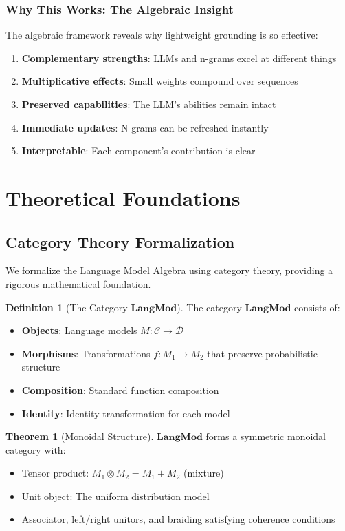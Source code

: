 \documentclass{article}
\theoremstyle{definition}
\newtheorem{definition}{Definition}
\newtheorem{theorem}{Theorem}
\begin{document}
\subsubsection{Why This Works: The Algebraic Insight}

The algebraic framework reveals why lightweight grounding is so effective:
\begin{enumerate}
    \item \textbf{Complementary strengths}: LLMs and n-grams excel at different things
    \item \textbf{Multiplicative effects}: Small weights compound over sequences
    \item \textbf{Preserved capabilities}: The LLM's abilities remain intact
    \item \textbf{Immediate updates}: N-grams can be refreshed instantly
    \item \textbf{Interpretable}: Each component's contribution is clear
\end{enumerate}

\section{Theoretical Foundations}

\subsection{Category Theory Formalization}

We formalize the Language Model Algebra using category theory, providing a rigorous mathematical foundation.

\begin{definition}[The Category $\mathbf{LangMod}$]
The category $\mathbf{LangMod}$ consists of:
\begin{itemize}
    \item \textbf{Objects}: Language models $M: \mathcal{C} \rightarrow \mathcal{D}$
    \item \textbf{Morphisms}: Transformations $f: M_1 \rightarrow M_2$ that preserve probabilistic structure
    \item \textbf{Composition}: Standard function composition
    \item \textbf{Identity}: Identity transformation for each model
\end{itemize}
\end{definition}

\begin{theorem}[Monoidal Structure]
$\mathbf{LangMod}$ forms a symmetric monoidal category with:
\begin{itemize}
    \item Tensor product: $M_1 \otimes M_2 = M_1 + M_2$ (mixture)
    \item Unit object: The uniform distribution model
    \item Associator, left/right unitors, and braiding satisfying coherence conditions
\end{itemize}
\end{theorem}
\end{document}
